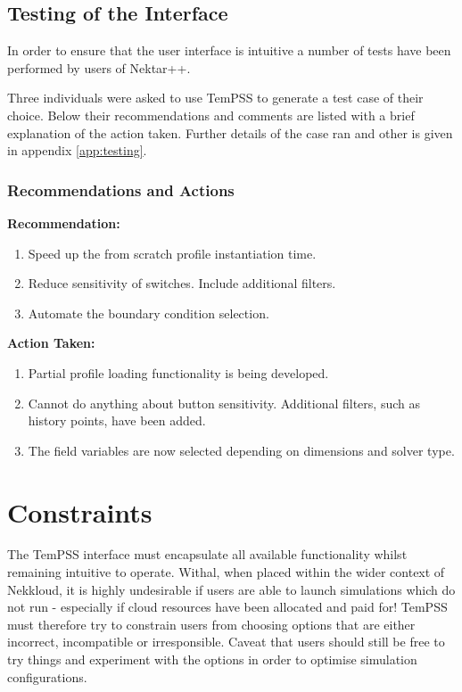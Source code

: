 \documentclass[11pt, a4paper]{report}
\begin{document}
\newpage
\section{Testing of the Interface}
In order to ensure that the user interface is intuitive a number of tests have been performed by users of Nektar++.

Three individuals were asked to use TemPSS to generate a test case of their choice. Below their recommendations and comments are listed with a brief explanation of the action taken. Further details of the case ran and other is given in appendix \ref{app:testing}.

\subsection{Recommendations and Actions}
\begin{multicols}{2}

\textbf{Recommendation:}
\begin{enumerate}
\item Speed up the from scratch profile instantiation time.
\item Reduce sensitivity of switches. Include additional filters.\\ 
\item Automate the boundary condition selection.\\
\end{enumerate}

\columnbreak

\textbf{Action Taken:}
\begin{enumerate}
\item Partial profile loading functionality is being developed.
\item Cannot do anything about button sensitivity. Additional filters, such as history points, have been added.
\item The field variables are now selected depending on dimensions and solver type.
\end{enumerate}

\end{multicols}

\chapter{Constraints}
\label{sec:constraints}
The TemPSS interface must encapsulate all available functionality whilst remaining intuitive to operate. Withal, when placed within the wider context of Nekkloud, it is highly undesirable if users are able to launch simulations which do not run - especially if cloud resources have been allocated and paid for! TemPSS must therefore try to constrain users from choosing options that are either incorrect, incompatible or irresponsible. Caveat that users should still be free to try things and experiment with the options in order to optimise simulation configurations.
\end{document}
